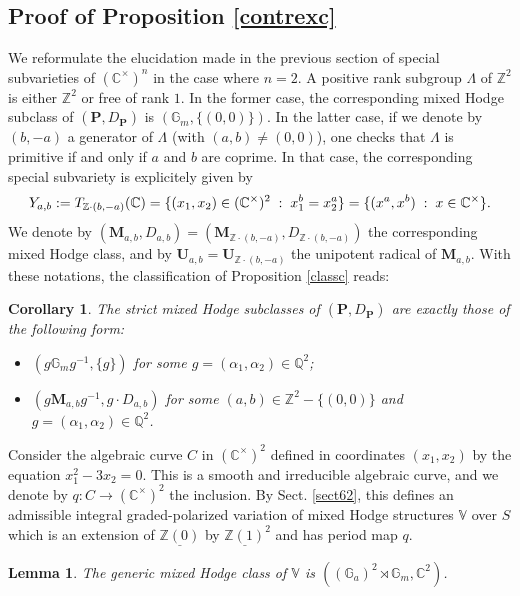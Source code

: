 \documentclass[10pt]{article}
\numberwithin{equation}{subsection}
\theoremstyle{plain}
\newtheorem{lemma}[theorem]{Lemma}
\newtheorem{corollary}[theorem]{Corollary}
\theoremstyle{definition}
\theoremstyle{remark}
\newcommand{\Z}{\mathbb Z}
\newcommand{\Q}{\mathbb Q}
\newcommand{\C}{\mathbb C}
\newcommand{\V}{\mathbb V}
\newcommand{\mult}{\mathbb G}
\newcommand{\pp}{\mathbf P}
\newcommand{\uu}{\mathbf U}
\newcommand{\M}{\mathbf M}
\begin{document}
\subsection{Proof of Proposition \ref{contrexc}}
We reformulate the elucidation made in the previous section of special subvarieties of $(\C^\times)^n$ in the case where $n = 2$. A positive rank subgroup $\Lambda$ of $\Z^2$ is either $\Z^2$ or free of rank $1$. In the former case, the corresponding mixed Hodge subclass of $(\pp, D_\pp)$ is $(\mult_m, \{(0,0)\})$. In the latter case, if we denote by $(b,-a)$ a generator of $\Lambda$ (with $(a,b) \neq (0,0)$), one checks that $\Lambda$ is primitive if and only if $a$ and $b$ are coprime. In that case, the corresponding special subvariety is explicitely given by
\[
Y_{a,b} := T_{\Z \cdot (b,-a)}(\C) = \{ (x_1, x_2) \in (\C^\times)^2 \hspace{0.1cm} : \hspace{0.1cm} x_1^b = x_2 ^a\} = \{(x^a, x^b) \hspace{0.1cm} : \hspace{0.1cm} x \in \C^\times\}.
\]
We denote by $(\M_{a,b}, D_{a,b}) = (\M_{\Z \cdot (b,-a)}, D_{\Z \cdot (b,-a)})$ the corresponding mixed Hodge class, and by $\uu_{a,b} = \uu_{\Z \cdot (b,-a)}$ the unipotent radical of $\M_{a,b}$. With these notations, the classification of Proposition \ref{classc} reads:
\begin{corollary}\label{classn2}
The strict mixed Hodge subclasses of $(\pp, D_\pp)$ are exactly those of the following form:
\begin{itemize}
\item[(i)] $(g \mult_m g^{-1}, \{g\})$ for some $g = (\alpha_1, \alpha_2) \in \Q^2$;
\item[(ii)] $(g\M_{a,b}g^{-1}, g \cdot D_{a,b})$ for some $(a,b) \in \Z^2-\{(0,0)\}$ and $g = (\alpha_1, \alpha_2) \in \Q^2$.
\end{itemize}
\end{corollary}
Consider the algebraic curve $C$ in $(\C^\times)^2$ defined in coordinates $(x_1,x_2)$ by the equation $x_1^2 - 3x_2 = 0$. This is a smooth and irreducible algebraic curve, and we denote by $q : C \rightarrow (\C^\times)^2$ the inclusion. By Sect. \ref{sect62}, this defines an admissible integral graded-polarized variation of mixed Hodge structures $\V$ over $S$ which is an extension of $\underline{\Z(0)}$ by $\underline{\Z(1)}^2$ and has period map $q$.
\begin{lemma}\label{genericc}
The generic mixed Hodge class of $\V$ is $((\mult_a)^2 \rtimes \mult_m, \C^2)$.
\end{lemma}
\end{document}
